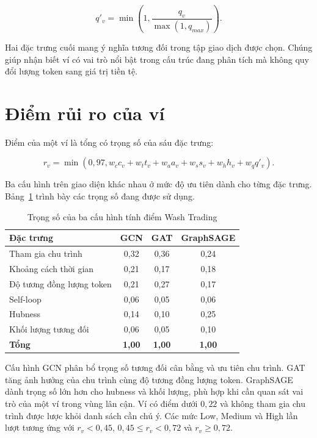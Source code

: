 \begin{equation}
q'_v=\min\left(1,\frac{q_v}{\max(1,q_{max})}\right).
\end{equation}

Hai đặc trưng cuối mang ý nghĩa tương đối trong tập giao dịch được chọn. Chúng giúp nhận biết ví có vai trò nổi bật trong cấu trúc đang phân tích mà không quy đổi lượng token sang giá trị tiền tệ.

\section{Điểm rủi ro của ví}

Điểm của một ví là tổng có trọng số của sáu đặc trưng:

\begin{equation}
r_v=\min\left(0{,}97,
w_c c_v+w_t t_v+w_a a_v+w_s s_v+w_h h_v+w_q q'_v\right).
\end{equation}

Ba cấu hình trên giao diện khác nhau ở mức độ ưu tiên dành cho từng đặc trưng. Bảng~\ref{tab:wash-trading-weights} trình bày các trọng số đang được sử dụng.

\begin{table}[H]
    \centering
    \caption{Trọng số của ba cấu hình tính điểm Wash Trading}
    \label{tab:wash-trading-weights}
    \begin{tabular}{lccc}
        \hline
        \textbf{Đặc trưng} & \textbf{GCN} & \textbf{GAT} & \textbf{GraphSAGE} \\
        \hline
        Tham gia chu trình & 0,32 & 0,36 & 0,24 \\
        Khoảng cách thời gian & 0,21 & 0,17 & 0,18 \\
        Độ tương đồng lượng token & 0,21 & 0,27 & 0,17 \\
        Self-loop & 0,06 & 0,05 & 0,06 \\
        Hubness & 0,14 & 0,10 & 0,25 \\
        Khối lượng tương đối & 0,06 & 0,05 & 0,10 \\
        \hline
        \textbf{Tổng} & \textbf{1,00} & \textbf{1,00} & \textbf{1,00} \\
        \hline
    \end{tabular}
\end{table}

Cấu hình GCN phân bổ trọng số tương đối cân bằng và ưu tiên chu trình. GAT tăng ảnh hưởng của chu trình cùng độ tương đồng lượng token. GraphSAGE dành trọng số lớn hơn cho hubness và khối lượng, phù hợp khi cần quan sát vai trò của một ví trong vùng lân cận. Ví có điểm dưới $0{,}22$ và không tham gia chu trình được lược khỏi danh sách cần chú ý. Các mức Low, Medium và High lần lượt tương ứng với $r_v<0{,}45$, $0{,}45\leq r_v<0{,}72$ và $r_v\geq0{,}72$.

